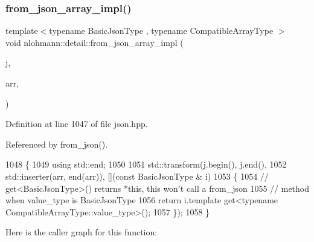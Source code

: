 \subsubsection{\texorpdfstring{from\+\_\+json\+\_\+array\+\_\+impl()}{from\_json\_array\_impl()}\hspace{0.1cm}{\footnotesize\ttfamily [1/3]}}
{\footnotesize\ttfamily template$<$typename Basic\+Json\+Type , typename Compatible\+Array\+Type $>$ \\
void nlohmann\+::detail\+::from\+\_\+json\+\_\+array\+\_\+impl (\begin{DoxyParamCaption}\item[{const Basic\+Json\+Type \&}]{j,  }\item[{Compatible\+Array\+Type \&}]{arr,  }\item[{\hyperlink{structnlohmann_1_1detail_1_1priority__tag}{priority\+\_\+tag}$<$ 0 $>$}]{ }\end{DoxyParamCaption})}



Definition at line 1047 of file json.\+hpp.



Referenced by from\+\_\+json().


\begin{DoxyCode}
1048 \{
1049     \textcolor{keyword}{using} std::end;
1050 
1051     std::transform(j.begin(), j.end(),
1052                    std::inserter(arr, end(arr)), [](\textcolor{keyword}{const} BasicJsonType & i)
1053     \{
1054         \textcolor{comment}{// get<BasicJsonType>() returns *this, this won't call a from\_json}
1055         \textcolor{comment}{// method when value\_type is BasicJsonType}
1056         \textcolor{keywordflow}{return} i.template get<typename CompatibleArrayType::value\_type>();
1057     \});
1058 \}
\end{DoxyCode}
Here is the caller graph for this function\+:
\mbox{\label{namespacenlohmann_1_1detail_a57f93ed57254a1639087cdc316e0fb83}} 
